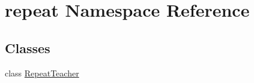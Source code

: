 \hypertarget{namespacerepeat}{}\section{repeat Namespace Reference}
\label{namespacerepeat}
\subsection*{Classes}
\begin{DoxyCompactItemize}
\item 
class \hyperlink{classrepeat_1_1RepeatTeacher}{Repeat\+Teacher}
\end{DoxyCompactItemize}

